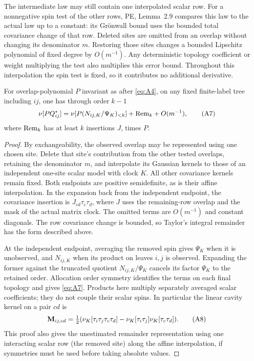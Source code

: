The intermediate law may still contain one interpolated scalar row.
For a nonnegative spin test of the other rows, PE, Lemma~2.9 compares
this law to the actual law up to a constant: its Gr\"onwall bound uses
the bounded total covariance change of that row. Deleted sites are
omitted from an overlap without changing its denominator \(m\).
Restoring those sites changes a bounded Lipschitz polynomial of fixed
degree by \(O(m^{-1})\). Any deterministic topology coefficient or
weight multiplying the test also multiplies this error bound. Throughout
this interpolation the spin test is fixed, so it contributes no
additional derivative.

\begin{lemma}
\label{found:cavity-quotient}
For overlap-polynomial \(P\) invariant as after \eqref{eq:A4}, on any fixed finite-label tree including \(ij\), one has through order \(k-1\)
\[
 \nu[P Q^*_{ij}]=\nu[P(N_{ij,K}/\Psi_K)_{<k}]
          +{\rm Rem}_k+O(m^{-1}),                                      \tag{A7}\label{eq:A7}
\]
where \({\rm Rem}_k\) has at least \(k\) insertions \(J\), times \(P\).
\end{lemma}

\begin{proof}
By exchangeability, the observed overlap may be represented using one
chosen site. Delete that site's contribution from the other tested
overlaps, retaining the denominator \(m\), and interpolate its Gaussian
kernels to those of an independent one-site scalar model with clock
\(K\). All other covariance kernels remain fixed. Both endpoints are
positive semidefinite, as is their affine interpolation. In the expansion
back from the independent endpoint, the covariance insertion is
\(J_{cd}\tau_c\tau_d\), where \(J\) uses the remaining-row overlap
and the mask of the actual matrix clock. The omitted terms are
\(O(m^{-1})\) and constant diagonals. The row covariance change is
bounded, so Taylor's integral remainder has the form described above.

At the independent endpoint, averaging the removed spin gives
\(\Psi_K\) when it is unobserved, and \(N_{ij,K}\) when its product
on leaves \(i,j\) is observed. Expanding the former against the
truncated quotient \(N_{ij,K}/\Psi_K\) cancels its factor \(\Psi_K\)
to the retained order. Allocation order symmetry identifies the terms
on each final topology and gives \eqref{eq:A7}. Products here multiply
separately averaged scalar coefficients; they do not couple their
scalar spins. In particular the linear cavity kernel on a pair \(cd\) is
\[
 {\bf M}_{ij,cd}=\tfrac12
 (\nu_K[\tau_i\tau_j\tau_c\tau_d]-\nu_K[\tau_i\tau_j]\nu_K[\tau_c\tau_d]).
                                                                    \tag{A8}\label{eq:A8}
\]
This proof also gives the unestimated remainder representation using one interacting scalar row (the removed site) along the affine interpolation, if symmetries must be used before taking absolute values.

\end{proof}

